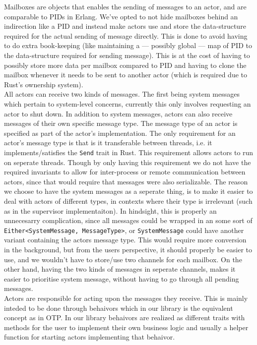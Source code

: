\documentclass[a4paper]{article}
\begin{document}
\noindent
Mailboxes are objects that enables the sending of messages to an actor, and are
comparable to PIDs in Erlang. We've opted to not hide mailboxes behind an
indirection like a PID and instead make actors use and store the data-structure
required for the actual sending of message directly. This is done to avoid
having to do extra book-keeping (like maintaining a --- possibly global --- map
of PID to the data-structure required for sending message). This is at the cost
of having to possibly store more data per mailbox compared to PID and having to
clone the mailbox whenever it needs to be sent to another actor (which is
required due to Rust's ownership system).\\

\noindent
All actors can receive two kinds of messages. The first being system messages
which pertain to system-level concerns, currently this only involves requesting
an actor to shut down. In addition to system messages, actors can also
receive messages of their own specific message type. The message type of an
actor is specified as part of the actor's implementation. The only requirement
for an actor's message type is that is it transferable between threads, i.e. it
implements/satisfies the \texttt{Send} trait in Rust. This requirement allows
actors to run on seperate threads. Though by only having this requirement we do
not have the required invariants to allow for inter-process or remote
communication between actors, since that would require that messages were also
serializable. The reason we choose to have the system messages as a seperate
thing, is to make it easier to deal with actors of different types, in contexts
where their type is irrelevant (such as in the supervisor implementaiton). In
hindsight, this is properly an unnecesarry complication, since all messages
could be wrapped in an some sort of \texttt{Either<SystemMessage, MessageType>},
or \texttt{SystemMessage} could have another variant containing the actors
message type. This would require more conversion in the background, but from the
users perspective, it should properly be easier to use, and we wouldn't have to
store/use two channels for each mailbox. On the other hand, having the two kinds
of messages in seperate channels, makes it easier to prioritise system message,
without having to go through all pending messages.\\

\noindent
Actors are responsible for acting upon the messages they receive. This is mainly
inteded to be done through behaivors which in our library is the equivalent
concept as in OTP. In our library behaivors are realized as different traits
with methods for the user to implement their own business logic and usually a
helper function for starting actors implementing that behaivor.\\
\end{document}

